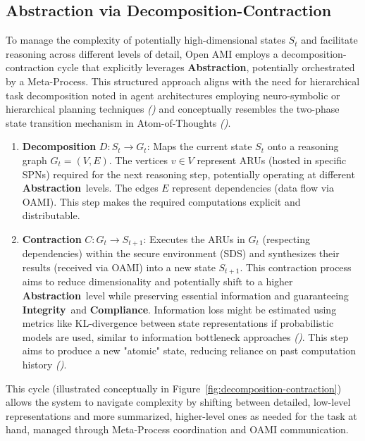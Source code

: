 \documentclass[12pt,a4paper]{report}
\renewcommand{\citep}[1]{\textit{\scriptsize{(\cite{#1})}}}
\newcommand{\Integrity}{\textbf{Integrity}}
\newcommand{\Abstraction}{\textbf{Abstraction}}
\begin{document}
	\subsection{Abstraction via Decomposition-Contraction}
	\label{sec:2-4-4}
	
	To manage the complexity of potentially high-dimensional states $S_t$ and facilitate reasoning across different levels of detail, Open AMI employs a decomposition-contraction cycle that explicitly leverages \Abstraction, potentially orchestrated by a Meta-Process. This structured approach aligns with the need for hierarchical task decomposition noted in agent architectures employing neuro-symbolic or hierarchical planning techniques \citep{AdditionalCitationRef52} and conceptually resembles the two-phase state transition mechanism in Atom-of-Thoughts \citep{Teng2025AtomOfThoughtsRef}.
	
	\begin{enumerate}
		\item \textbf{Decomposition} $D: S_t \rightarrow G_t$: Maps the current state $S_t$ onto a reasoning graph $G_t=(V, E)$. The vertices $v \in V$ represent ARUs (hosted in specific SPNs) required for the next reasoning step, potentially operating at different \Abstraction\ levels. The edges $E$ represent dependencies (data flow via OAMI). This step makes the required computations explicit and distributable.
		\item \textbf{Contraction} $C: G_t \rightarrow S_{t+1}$: Executes the ARUs in $G_t$ (respecting dependencies) within the secure environment (SDS) and synthesizes their results (received via OAMI) into a new state $S_{t+1}$. This contraction process aims to reduce dimensionality and potentially shift to a higher \Abstraction\ level while preserving essential information and guaranteeing \Integrity\ and \textbf{Compliance}. Information loss might be estimated using metrics like KL-divergence between state representations if probabilistic models are used, similar to information bottleneck approaches \citep{Tishby2000InformationBottleneck}. This step aims to produce a new "atomic" state, reducing reliance on past computation history \citep{Teng2025AtomOfThoughtsRef}.
	\end{enumerate}
	This cycle (illustrated conceptually in Figure~\ref{fig:decomposition-contraction}) allows the system to navigate complexity by shifting between detailed, low-level representations and more summarized, higher-level ones as needed for the task at hand, managed through Meta-Process coordination and OAMI communication.
	
\end{document}
